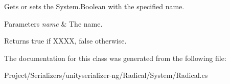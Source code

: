 Gets or sets the System.\+Boolean with the specified name. 


\begin{DoxyParams}{Parameters}
{\em name} & The name.\\
\hline
\end{DoxyParams}
\begin{DoxyReturn}{Returns}
{\ttfamily true} if X\+X\+XX, {\ttfamily false} otherwise.
\end{DoxyReturn}


The documentation for this class was generated from the following file\+:\begin{DoxyCompactItemize}
\item 
Project/\+Serializers/unityserializer-\/ng/\+Radical/\+System/Radical.\+cs\end{DoxyCompactItemize}
